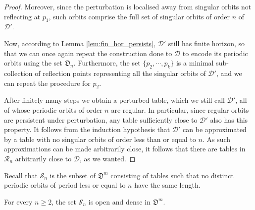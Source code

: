 \documentclass[reqno,11pt]{amsart}
\begin{document}
\begin{proof}
    Moreover, since the perturbation is localised away from singular orbits not reflecting at \( p_1 \), such orbits comprise the full set of singular orbits of order \( n \) of \( \mathcal{D}' \).
    \par Now, according to Lemma \ref{lem:fin_hor_persists}, \( \mathcal{D}' \) still has finite horizon, so that we can once again repeat the construction done to \( \mathcal{D} \) to encode its periodic orbits using the set \( \mathfrak{D}_n \). 
    Furthermore, the set \( \{p_2, \cdots, p_k\} \) is a minimal sub-collection of reflection points representing all the singular orbits of \( \mathcal{D}' \), and we can repeat the procedure for \( p_2 \).
    \par After finitely many steps we obtain a perturbed table, which we still call \( \mathcal{D}' \), all of whose periodic orbits of order \( n \) are regular.
    In particular, since regular orbits are persistent under perturbation, any table sufficiently close to \( \mathcal{D}' \) also has this property.
    It follows from the induction hypothesis that \( \mathcal{D}' \) can be approximated by a table with no singular orbits of order less than or equal to \( n \).
    As such approximations can be made arbitrarily close, it follows that there are tables in \( \mathcal{R}_n \) arbitrarily close to \( \mathcal{D} \), as we wanted.
\end{proof}

Recall that \( \mathcal{S}_n \) is the subset of \( \mathfrak{D}^m \) consisting of tables such that no distinct periodic orbits of period less or equal to \( n \) have the same length. 


\begin{lemma}\label{lem:dense_simple_n}
For every \( n \geq 2 \), the set \( \mathcal{S}_n \) is open and dense in \( \mathfrak{D}^m \). 
\end{lemma}
\end{document}

